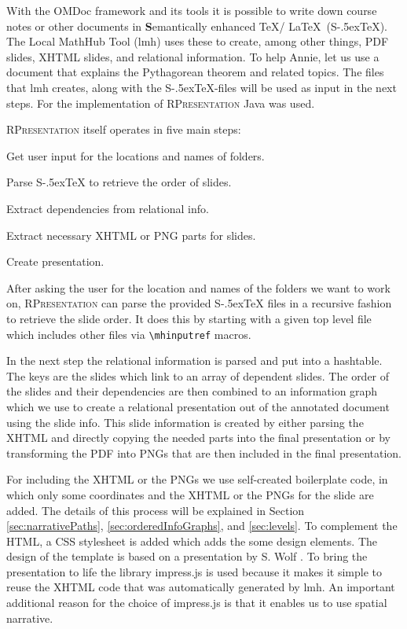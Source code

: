 \documentclass{llncs}
\def\stex{\texorpdfstring{\raisebox{-.5ex}S\kern-.5ex\TeX}{sTeX}\xspace}
\def\sTeX{\stex}
\newcommand{\sys}{\textsc{RPresentation}\xspace}
\begin{document}
With the OMDoc framework and its tools it is possible to write down course notes or other documents in \textbf{S}emantically enhanced \TeX / \LaTeX\ (\stex). The Local MathHub Tool (lmh) uses these to create, among other things, PDF slides, XHTML slides, and relational information. To help Annie, let us use a document that explains the Pythagorean theorem and related topics. The files that lmh creates, along with the \stex -files will be used as input in the next steps. For the implementation of  \sys Java was used.

\sys itself operates in five main steps:
\begin{compactenum}
\item Get user input for the locations and names of folders.
\item Parse \sTeX to retrieve the order of slides.
\item Extract dependencies from relational info.
\item Extract necessary XHTML or PNG parts for slides.
\item Create presentation.
\end{compactenum}

After asking the user for the location and names of the folders we want to work on, \sys
can parse the provided \stex files in a recursive fashion to retrieve the slide order. It
does this by starting with a given top level file which includes other files via
\texttt{\textbackslash mhinputref} macros.

In the next step the relational information is parsed and put into a hashtable. The keys are the slides which link to an array of dependent slides. The order of the slides and their dependencies are then combined to an information graph which we use to create a relational presentation out of the annotated document using the slide info. This slide information is created by either parsing the XHTML and directly copying the needed parts into the final presentation or by transforming the PDF into PNGs that are then included in the final presentation.

For including the XHTML or the PNGs we use self-created boilerplate code, in which only
some coordinates and the XHTML or the PNGs for the slide are added. The details of this
process will be explained in Section \ref{sec:narrativePaths},
\ref{sec:orderedInfoGraphs}, and \ref{sec:levels}. To complement the HTML, a CSS
stylesheet is added which adds the some design elements. The design of the template is
based on a presentation by S. Wolf \cite{Wolf:npentrel15}. To bring the presentation to
life the library impress.js is used because it makes it simple to reuse the XHTML code
that was automatically generated by lmh. An important additional reason for the choice of
impress.js \cite{JSImpress:npentrel14} is that it enables us to use spatial narrative.
\end{document}
